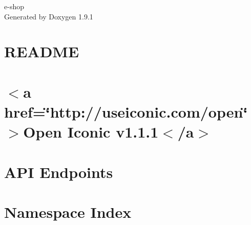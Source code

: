 \let\mypdfximage\pdfximage\def\pdfximage{\immediate\mypdfximage}\documentclass[twoside]{book}
\newcommand{\+}{\discretionary{\mbox{\scriptsize$\hookleftarrow$}}{}{}}
\newcommand{\clearemptydoublepage}{%
  \newpage{\pagestyle{empty}\cleardoublepage}%
}
\begin{document}
\raggedbottom

\hypersetup{pageanchor=false,
             bookmarksnumbered=true,
             pdfencoding=unicode
            }
\begin{titlepage}
\vspace*{7cm}
\begin{center}%
{\Large e-\/shop }\\
\vspace*{1cm}
{\large Generated by Doxygen 1.9.1}\\
\end{center}
\end{titlepage}
\clearemptydoublepage
{}
\tableofcontents
\clearemptydoublepage
{}
\hypersetup{pageanchor=true}

\chapter{README}
\label{md__c___users_ishaan_marjit__desktop__maverick__dev__prod_e_shop_on_web__r_e_a_d_m_e}

\chapter{$<$a href=\char`\"{}http\+://useiconic.\+com/open\char`\"{}$>$Open Iconic v1.1.1$<$/a$>$}
\label{md__c___users_ishaan_marjit__desktop__maverick__dev__prod_e_shop_on_web_src__blazor_admin_wwwroot_css_open_iconic__r_e_a_d_m_e}

\chapter{API Endpoints}
\label{md__c___users_ishaan_marjit__desktop__maverick__dev__prod_e_shop_on_web_src__public_api__r_e_a_d_m_e}

\chapter{Namespace Index}

\end{document}
